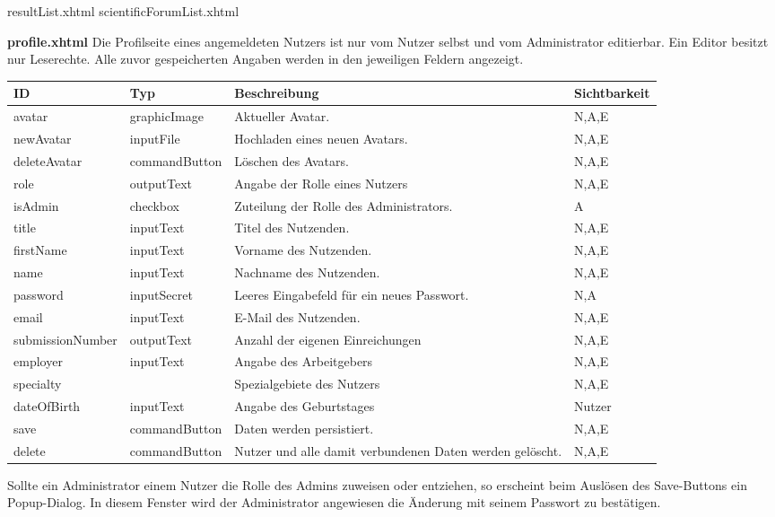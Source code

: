 resultList.xhtml
scientificForumList.xhtml

\textbf{profile.xhtml} Die Profilseite eines angemeldeten Nutzers ist nur vom Nutzer selbst und vom Administrator editierbar.
Ein Editor besitzt nur Leserechte. Alle zuvor gespeicherten Angaben werden in den jeweiligen Feldern angezeigt.

\begin{tabular}[H]{|m{2cm}|m{3cm}|m{6cm}|m{2.5cm}|}
    \hline
    \textbf{ID} & \textbf{Typ} & \textbf{Beschreibung} & \textbf{Sichtbarkeit} \\
    \hline
    \hline
    avatar & graphicImage & Aktueller Avatar. & N,A,E\\
    \hline
    newAvatar & inputFile & Hochladen eines neuen Avatars. & N,A,E\\
    \hline
    deleteAvatar & commandButton & Löschen des Avatars. & N,A,E\\
    \hline
    role & outputText & Angabe der Rolle eines Nutzers & N,A,E\\
    \hline
    isAdmin & checkbox & Zuteilung der Rolle des Administrators. & A\\
    \hline
    title & inputText & Titel des Nutzenden. & N,A,E\\
    \hline
    firstName & inputText & Vorname des Nutzenden. & N,A,E\\
    \hline
    name & inputText & Nachname des Nutzenden. & N,A,E\\
    \hline
    password & inputSecret & Leeres Eingabefeld für ein neues Passwort. & N,A\\
    \hline
    email & inputText & E-Mail des Nutzenden. & N,A,E\\
    \hline
    submissionNumber & outputText & Anzahl der eigenen Einreichungen & N,A,E\\
    \hline
    employer & inputText & Angabe des Arbeitgebers & N,A,E\\
    \hline
    specialty & & Spezialgebiete des Nutzers & N,A,E \\
    \hline
    dateOfBirth & inputText & Angabe des Geburtstages & Nutzer\\
    \hline
    save & commandButton & Daten werden persistiert. & N,A,E\\
    \hline
    delete & commandButton & Nutzer und alle damit verbundenen Daten werden gelöscht. & N,A,E\\
    \hline
\end{tabular}

Sollte ein Administrator einem Nutzer die Rolle des Admins zuweisen oder entziehen, so erscheint beim Auslösen des Save-Buttons ein Popup-Dialog.
In diesem Fenster  wird der Administrator angewiesen die Änderung mit seinem Passwort zu bestätigen.

